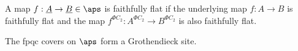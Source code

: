 \begin{definition}
     A map $f:\underline{A}\to \underline{B}\in \aps$ is faithfully flat if the underlying map $f:A\to B$ is faithfully flat and the map $f^{\Phi C_2}:A^{\Phi C_2}\to B^{\Phi C_2}$ is also faithfully flat.
\end{definition}

\begin{lemma}
    The fpqc covers on $\aps$ form a Grothendieck site. 
\end{lemma}

